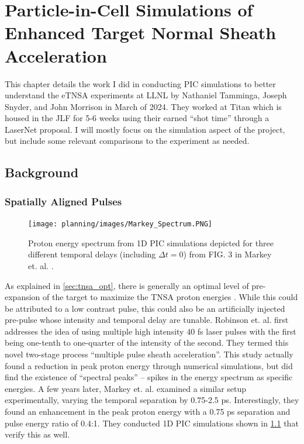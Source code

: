 \chapter{Particle-in-Cell Simulations of Enhanced Target Normal Sheath Acceleration} \label{ch:4}

This chapter details the work I did in conducting \gls{PIC} simulations to better understand the \gls{eTNSA} experiments at \gls{LLNL} by Nathaniel Tamminga, Joseph Snyder, and John Morrison in March of 2024. They worked at Titan which is housed in the \gls{JLF} for 5-6 weeks using their earned ``shot time'' through a LaserNet proposal. I will mostly focus on the simulation aspect of the project, but include some relevant comparisons to the experiment as needed. 

\section{Background}

\subsection{Spatially Aligned Pulses} \label{sec:spatialalign}

\begin{figure}
	\centering 
	\texttt{[image: planning/images/Markey\_Spectrum.PNG]}
	\caption{Proton energy spectrum from 1D \gls{PIC} simulations depicted for three different temporal delays (including $\Delta t = 0$) from FIG. 3 in Markey et. al. \cite{Markey_2010_PRL}.}
	\label{fig:markey_spectrum}
\end{figure}

As explained in \cref{sec:tnsa_opt}, there is generally an optimal level of pre-expansion of the target to maximize the \gls{TNSA} proton energies \cite{McKenna_2008_LaPB,Fuchs_2007_PRL}. While this could be attributed to a low contrast pulse, this could also be an artificially injected pre-pulse whose intensity and temporal delay are tunable. Robinson et. al. \cite{Robinson_2007_PPCF} first addresses the idea of using multiple high intensity 40 fs laser pulses with the first being one-tenth to one-quarter of the intensity of the second. They termed this novel two-stage process ``multiple pulse sheath acceleration''. This study actually found a reduction in peak proton energy through numerical simulations, but did find the existence of ``spectral peaks'' -- spikes in the energy spectrum as specific energies. A few years later, Markey et. al. \cite{Markey_2010_PRL} examined a similar setup experimentally, varying the temporal separation by 0.75-2.5 ps. Interestingly, they found an enhancement in the peak proton energy with a 0.75 ps separation and pulse energy ratio of 0.4:1. They conducted 1D PIC simulations shown in \cref{fig:markey_spectrum} that verify this as well.

